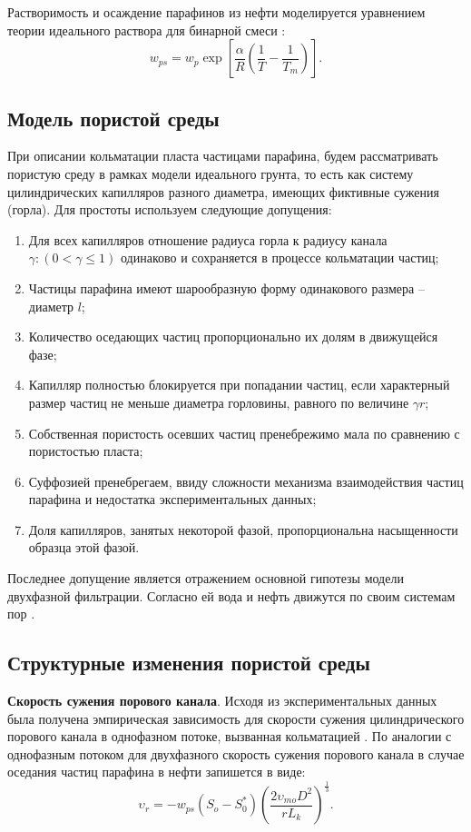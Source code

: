 \documentclass[a4paper,12pt]{article}
\begin{document}
Растворимость и осаждение парафинов из нефти моделируется уравнением теории идеального раствора для бинарной смеси \cite{bib:03}:
\begin{equation} \label{eq6}
w_{ps} = w_p \exp[\frac{\alpha}{R}(\frac{1}{T} - \frac{1}{T_m})]. 
\end{equation}

\vspace{1em}
{\subsection*{\normalsize Модель пористой среды}}
	 При описании кольматации пласта частицами парафина, будем рассматривать пористую среду в рамках модели идеального грунта, то есть как систему цилиндрических капилляров разного диаметра, имеющих фиктивные сужения (горла). Для простоты используем следующие допущения:
\begin{enumerate} 
	\item Для всех капилляров отношение радиуса горла к радиусу канала $\gamma :(0< \gamma \leq 1)$ одинаково и сохраняется в процессе кольматации частиц;
	\item Частицы парафина имеют шарообразную форму одинакового размера – диаметр $l$;
	\item Количество оседающих частиц пропорционально их долям в движущейся фазе;
	\item Капилляр полностью блокируется при попадании частиц, если характерный размер частиц не меньше диаметра горловины, равного по величине $\gamma r$;
	\item Собственная пористость осевших частиц пренебрежимо мала по сравнению с пористостью пласта;
	\item Суффозией пренебрегаем, ввиду сложности механизма взаимодействия частиц парафина и недостатка экспериментальных данных;
	\item Доля капилляров, занятых некоторой фазой, пропорциональна насыщенности образца этой фазой.
\end{enumerate}
Последнее допущение является отражением основной гипотезы модели двухфазной фильтрации. Согласно ей вода и нефть движутся по своим системам пор \cite{bib:05}.

\vspace{1em}
{\subsection*{\normalsize Структурные изменения пористой среды}}
	\textbf{Скорость сужения порового канала}. Исходя из экспериментальных данных была получена эмпирическая зависимость для скорости сужения цилиндрического порового канала в однофазном потоке, вызванная кольматацией \cite{bib:04}. По аналогии с однофазным потоком для двухфазного скорость сужения порового канала в случае оседания частиц парафина в нефти запишется в виде:
\begin{equation}\label{eq7}
\upsilon_r = -w_{ps} (S_o-S_{0}^{*}) \left ( \frac{2 \upsilon_{mo} D^2}{r L_k} \right )^{\frac{1}{3}}.
\end{equation}
\end{document}
